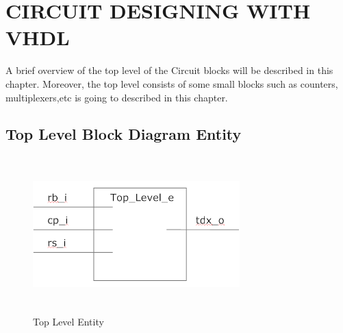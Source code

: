 \documentclass[12pt,a4paper]{article}
\begin{document}
\section{CIRCUIT DESIGNING WITH VHDL}
A brief overview of the top level of the Circuit blocks will be described in this chapter. Moreover, the top level consists of some small blocks such as counters, multiplexers,etc is going to described in this chapter.\\


\subsection{Top Level Block Diagram Entity}

\begin{figure}[H]
\centering
\includegraphics[width=8cm,height=6cm]{TopLevelE.PNG}
\caption{Top Level Entity}
\label{Top Level Entity}
\end{figure}
\end{document}
